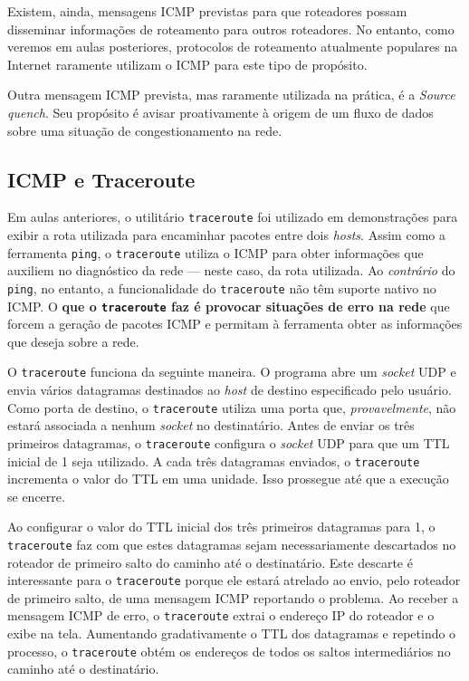 \documentclass{article}
\begin{document}
Existem, ainda, mensagens ICMP previstas para que roteadores possam disseminar informações de roteamento para outros roteadores. No entanto, como veremos em aulas posteriores, protocolos de roteamento atualmente populares na Internet raramente utilizam o ICMP para este tipo de propósito.

Outra mensagem ICMP prevista, mas raramente utilizada na prática, é a \textit{Source quench}. Seu propósito é avisar proativamente à origem de um fluxo de dados sobre uma situação de congestionamento na rede.

\subsection{ICMP e Traceroute}

Em aulas anteriores, o utilitário \texttt{traceroute} foi utilizado em demonstrações para exibir a rota utilizada para encaminhar pacotes entre dois \textit{hosts}. Assim como a ferramenta \texttt{ping}, o \texttt{traceroute} utiliza o ICMP para obter informações que auxiliem no diagnóstico da rede --- neste caso, da rota utilizada. Ao \textit{contrário} do \texttt{ping}, no entanto, a funcionalidade do \texttt{traceroute} não têm suporte nativo no ICMP. O\textbf{ que o \texttt{traceroute} faz é provocar situações de erro na rede} que forcem a geração de pacotes ICMP e permitam à ferramenta obter as informações que deseja sobre a rede.

O \texttt{traceroute} funciona da seguinte maneira. O programa abre um \textit{socket} UDP e envia vários datagramas destinados ao \textit{host} de destino especificado pelo usuário. Como porta de destino, o \texttt{traceroute} utiliza uma porta que, \textit{provavelmente}, não estará associada a nenhum \textit{socket} no destinatário. Antes de enviar os três primeiros datagramas, o \texttt{traceroute} configura o \textit{socket} UDP para que um TTL inicial de 1 seja utilizado. A cada três datagramas enviados, o \texttt{traceroute} incrementa o valor do TTL em uma unidade. Isso prossegue até que a execução se encerre.

Ao configurar o valor do TTL inicial dos três primeiros datagramas para 1, o \texttt{traceroute} faz com que estes datagramas sejam necessariamente descartados no roteador de primeiro salto do caminho até o destinatário. Este descarte é interessante para o \texttt{traceroute} porque ele estará atrelado ao envio, pelo roteador de primeiro salto, de uma mensagem ICMP reportando o problema. Ao receber a mensagem ICMP de erro, o \texttt{traceroute} extrai o endereço IP do roteador e o exibe na tela. Aumentando gradativamente o TTL dos datagramas e repetindo o processo, o \texttt{traceroute} obtém os endereços de todos os saltos intermediários no caminho até o destinatário.
\end{document}

